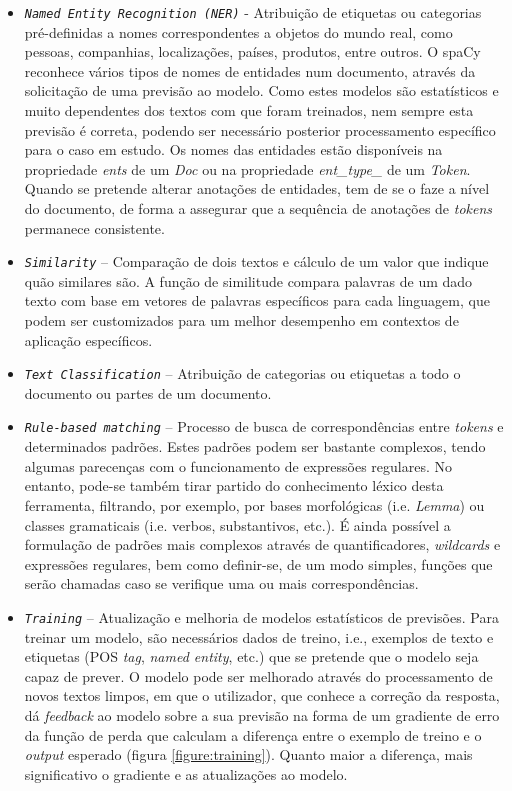 \documentclass[12pt]{article}
\begin{document}
\begin{itemize}
	\item \texttt{\textit{Named Entity Recognition (NER)}} - Atribuição de etiquetas ou categorias pré-definidas a nomes correspondentes a objetos do mundo real, como pessoas, companhias, localizações, países, produtos, entre outros. O spaCy reconhece vários tipos de nomes de entidades num documento, através da solicitação de uma previsão ao modelo. Como estes modelos são estatísticos e muito dependentes dos textos com que foram treinados, nem sempre esta previsão é correta, podendo ser necessário posterior processamento específico para o caso em estudo. Os nomes das entidades estão disponíveis na propriedade \textit{ents} de um \textit{Doc} ou na propriedade \textit{ent\_type\_} de um \textit{Token}. Quando se pretende alterar anotações de entidades, tem de se o faze a nível do documento, de forma a assegurar que a sequência de anotações de \textit{tokens} permanece consistente.
	
	\item \texttt{\textit{Similarity}} -- Comparação de dois textos e cálculo de um valor que indique quão similares são. A função de similitude compara palavras de um dado texto com base em vetores de palavras específicos para cada linguagem, que podem ser customizados para um melhor desempenho em contextos de aplicação específicos.
	
	\item \texttt{\textit{Text Classification}} -- Atribuição de categorias ou etiquetas a todo o documento ou partes de um documento.
	
	\item \texttt{\textit{Rule-based matching}} -- Processo de busca de correspondências entre \textit{tokens} e determinados padrões. Estes padrões podem ser bastante complexos, tendo algumas parecenças com o funcionamento de expressões regulares. No entanto, pode-se também tirar partido do conhecimento léxico desta ferramenta, filtrando, por exemplo, por bases morfológicas (i.e. \textit{Lemma}) ou classes gramaticais (i.e. verbos, substantivos, etc.). É ainda possível a formulação de padrões mais complexos através de quantificadores, \textit{wildcards} e expressões regulares, bem como definir-se, de um modo simples, funções que serão chamadas caso se verifique uma ou mais correspondências.
	
	\item \texttt{\textit{Training}} -- Atualização e melhoria de modelos estatísticos de previsões. Para treinar um modelo, são necessários dados de treino, i.e., exemplos de texto e etiquetas (POS \textit{tag}, \textit{named entity}, etc.) que se pretende que o modelo seja capaz de prever. O modelo pode ser melhorado através do processamento de novos textos limpos, em que o utilizador, que conhece a correção da resposta, dá \textit{feedback} ao modelo sobre a sua previsão na forma de um gradiente de erro da função de perda que calculam a diferença entre o exemplo de treino e o \textit{output} esperado (figura \ref{figure:training}). Quanto maior a diferença, mais significativo o gradiente e as atualizações ao modelo.


\end{itemize}
\end{document}
